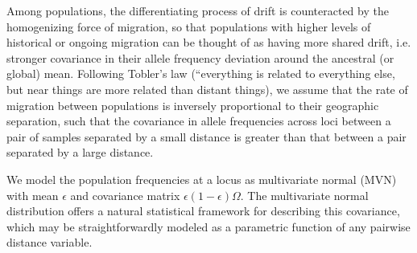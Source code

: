 \documentclass[12pt]{article}
\begin{document}
Among populations, the differentiating process of drift is counteracted by the homogenizing force of migration, so that populations with higher levels of historical or ongoing migration can be thought of as having more shared drift, i.e. stronger covariance in their allele frequency deviation around the ancestral (or global) mean.  Following Tobler's law (``everything is related to everything else, but near things are more related than distant things), we assume that the rate of migration between populations is inversely proportional to their geographic separation, such that the covariance in allele frequencies across loci between a pair of samples separated by a small distance is greater than that between a pair separated by a large distance.  

We model the population frequencies at a locus as multivariate normal (MVN) with mean $\epsilon$ and covariance matrix $\epsilon(1 - \epsilon)\Omega$.  The multivariate normal distribution offers a natural statistical framework for describing this covariance, which may be straightforwardly modeled as a parametric function of any pairwise distance variable.
\end{document}
